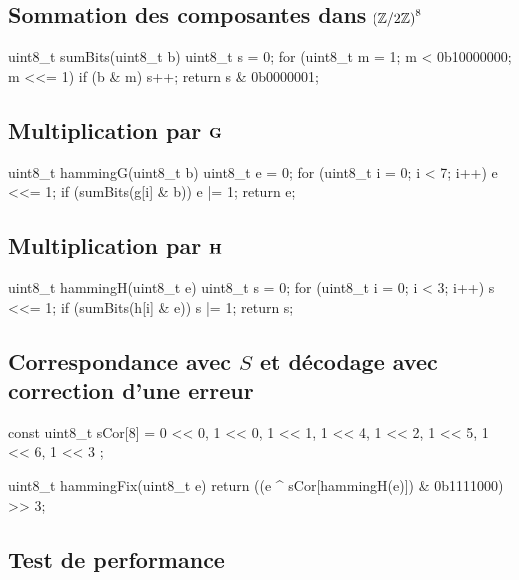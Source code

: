 \documentclass[a4paper,french,bookmarks]{article}
\begin{document}
    \subsection{Sommation des composantes dans $\!\left(\mathbb{Z}/2\mathbb{Z}\right)^8$}
    
    \begin{C}
uint8_t sumBits(uint8_t b)
{
    uint8_t s = 0;
    for (uint8_t m = 1; m < 0b10000000; m <<= 1) {
        if (b & m) s++;
    }
    return s & 0b0000001;
}
    \end{C}

    \subsection{Multiplication par $\mathbf{G}$}
    \begin{C}
uint8_t hammingG(uint8_t b)
{
    uint8_t e = 0;
    for (uint8_t i = 0; i < 7; i++) {
        e <<= 1;
        if (sumBits(g[i] & b)) e |= 1;
    }
    return e;
}
    \end{C}

    \subsection{Multiplication par $\mathbf{H}$}
    
    \begin{C}
uint8_t hammingH(uint8_t e)
{
    uint8_t s = 0;
    for (uint8_t i = 0; i < 3; i++)
    {
        s <<= 1;
        if (sumBits(h[i] & e)) s |= 1;
    }
    return s;
}
    \end{C}


\newpage     \subsection{Correspondance avec $S$ et décodage avec correction d'une erreur}
    \begin{C}
const uint8_t sCor[8] =
        {
                0 << 0,
                1 << 0,
                1 << 1,
                1 << 4,
                1 << 2,
                1 << 5,
                1 << 6,
                1 << 3
        };

uint8_t hammingFix(uint8_t e) {
    return ((e ^ sCor[hammingH(e)]) & 0b1111000)
    >> 3;
}

    \end{C}


    \subsection{Test de performance}
\end{document}
